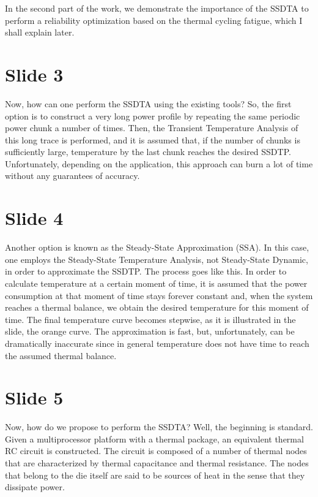 \documentclass[11pt,a4paper]{article}
\begin{document}
In the second part of the work, we demonstrate the importance of the SSDTA to perform a reliability optimization based on the thermal cycling fatigue, which I shall explain later.

\section{Slide 3}
Now, how can one perform the SSDTA using the existing tools? So, the first option is to construct a very long power profile by repeating the same periodic power chunk a number of times. Then, the Transient Temperature Analysis of this long trace is performed, and it is assumed that, if the number of chunks is sufficiently large, temperature by the last chunk reaches the desired SSDTP. Unfortunately, depending on the application, this approach can burn a lot of time without any guarantees of accuracy.

\section{Slide 4}
Another option is known as the Steady-State Approximation (SSA). In this case, one employs the Steady-State Temperature Analysis, not Steady-State Dynamic, in order to approximate the SSDTP. The process goes like this. In order to calculate temperature at a certain moment of time, it is assumed that the power consumption at that moment of time stays forever constant and, when the system reaches a thermal balance, we obtain the desired temperature for this moment of time. The final temperature curve becomes stepwise, as it is illustrated in the slide, the orange curve. The approximation is fast, but, unfortunately, can be dramatically inaccurate since in general temperature does not have time to reach the assumed thermal balance.

\section{Slide 5}
Now, how do we propose to perform the SSDTA? Well, the beginning is standard. Given a multiprocessor platform with a thermal package, an equivalent thermal RC circuit is constructed. The circuit is composed of a number of thermal nodes that are characterized by thermal capacitance and thermal resistance. The nodes that belong to the die itself are said to be sources of heat in the sense that they dissipate power.
\end{document}
